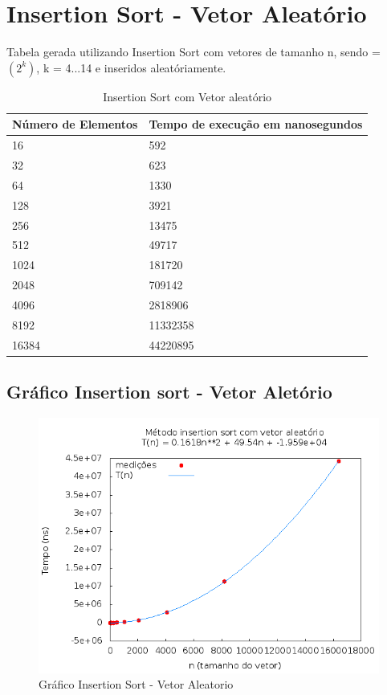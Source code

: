 \documentclass[12pt,a4paper,twoside]{report}
\begin{document}
\section{Insertion Sort - Vetor Aleatório}
Tabela gerada utilizando Insertion Sort com vetores de tamanho n, sendo = $(2^k)$, k = 4...14 e inseridos aleatóriamente.
\begin{table}[H]
\centering
\caption{Insertion Sort com Vetor aleatório}
\begin{tabular}{|l|l|}
\hline
\multicolumn{1}{|c|}{\textbf{Número de Elementos}} & \multicolumn{1}{c|}{\textbf{Tempo de execução em nanosegundos}} \\ \hline
16 & 592 \\ \hline
32 & 623 \\ \hline
64 & 1330 \\ \hline
128 & 3921 \\ \hline
256 & 13475 \\ \hline
512 & 49717 \\ \hline
1024 & 181720 \\ \hline
2048 & 709142 \\ \hline
4096 & 2818906 \\ \hline
8192 & 11332358 \\ \hline
16384 & 44220895 \\ \hline
\end{tabular}
\end{table}

\subsection{Gráfico Insertion sort - Vetor Aletório}
\begin{figure}[H]
    \centering
    \includegraphics[width=0.7\linewidth]{graficos/Insertion/vIntAleatorio/vIntAleatorio.png}
  \caption{Gráfico Insertion Sort - Vetor Aleatorio}
\end{figure}
\end{document}

